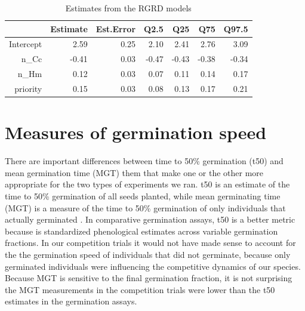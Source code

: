 \documentclass{article}
\begin{document}
\begin{table}[ht]
\centering
\begin{tabular}{rrrrrrr}
  \hline
 & Estimate & Est.Error & Q2.5 & Q25 & Q75 & Q97.5 \\ 
  \hline
Intercept & 2.59 & 0.25 & 2.10 & 2.41 & 2.76 & 3.09 \\ 
  n\_Cc & -0.41 & 0.03 & -0.47 & -0.43 & -0.38 & -0.34 \\ 
  n\_Hm & 0.12 & 0.03 & 0.07 & 0.11 & 0.14 & 0.17 \\ 
  priority & 0.15 & 0.03 & 0.08 & 0.13 & 0.17 & 0.21 \\ 
   \hline
\end{tabular}
\caption{Estimates from the RGRD models}
\label{tab:RGRD}
\end{table}

\pagebreak
\section*{Measures of germination speed}
There are important differences between time to 50\% germination (t50) and mean germination time (MGT) them that make one or the other more appropriate for the two types of experiments we ran. t50 is an estimate of the time to 50\% germination of all seeds planted, while mean germinating time (MGT) is a measure of the time to 50\% germination of only individuals that actually germinated \citep{Soltani:2015aa}. In comparative germination assays, t50 is a better metric because is standardized phenological estimates across variable germination fractions. In our competition trials it would not have made sense to account for the the germination speed of individuals that did not germinate, because only germinated individuals were influencing the competitive dynamics of our species. Because MGT is sensitive to the final germination fraction, it is not surprising the MGT measurements in the competition trials  were lower than the t50 estimates in the germination assays.

\end{document}
